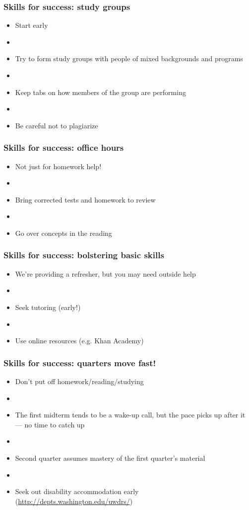 \documentclass[12pt]{beamer}
\newcommand{\myframe}[1]{\begin{frame} \frametitle{#1}}
\begin{document}
\myframe{Skills for success: study groups}
\begin{itemize}
\item Start early
\item[]
\item Try to form study groups with people of mixed backgrounds and programs
\item[]
\item Keep tabs on how members of the group are performing
\item[]
\item Be careful not to plagiarize
\end{itemize}
\end{frame}

\myframe{Skills for success: office hours}
\begin{itemize}
\item Not just for homework help!
\item[]
\item Bring corrected tests and homework to review
\item[]
\item Go over concepts in the reading
\end{itemize}
\end{frame}

\myframe{Skills for success: bolstering basic skills}
\begin{itemize}
\item We're providing a refresher, but you may need outside help
\item[]
\item Seek tutoring (early!)
\item[]
\item Use online resources (e.g. Khan Academy)
\end{itemize}
\end{frame}

\myframe{Skills for success: quarters move fast!}
\begin{itemize}
\item Don't put off homework/reading/studying
\item[]
\item The first midterm tends to be a wake-up call, but the pace picks up after it --- no time to catch up
\item[]
\item Second quarter assumes mastery of the first quarter's material
\item[]
\item Seek out disability accommodation early (\url{http://depts.washington.edu/uwdrs/})
\end{itemize}
\end{frame}
\end{document}
